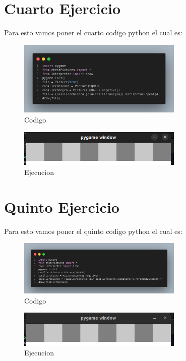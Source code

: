 \documentclass[10pt, a4paper]{article}
\begin{document}
\section{Cuarto Ejercicio}
Para esto vamos poner el cuarto codigo python el cual es:  
\begin{figure}[H]
  \centering
  \includegraphics[width=0.7\textwidth]{img/Ej4.png}
  \caption{Codigo}
\end{figure}

\begin{figure}[H]
  \centering
  \includegraphics[width=0.7\textwidth]{img/Ejercicio4.png}
  \caption{Ejecucion}
\end{figure}

\section{Quinto Ejercicio}
Para esto vamos poner el quinto codigo python el cual es:  
\begin{figure}[H]
  \centering
  \includegraphics[width=0.7\textwidth]{img/Ej5.png}
  \caption{Codigo}
\end{figure}

\begin{figure}[H]
  \centering
  \includegraphics[width=0.7\textwidth]{img/Ejercicio5.png}
  \caption{Ejecucion}
\end{figure}
\end{document}
